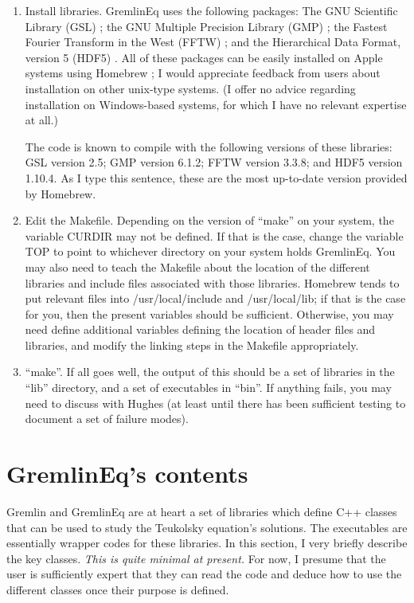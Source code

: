 \documentclass[11pt]{article}
\begin{document}
\begin{enumerate}

\item Install libraries.  GremlinEq uses the following packages: The GNU Scientific Library (GSL) {\cite{gsl}}; the GNU Multiple Precision Library (GMP) {\cite{gmp}}; the Fastest Fourier Transform in the West (FFTW) {\cite{fftw}}; and the Hierarchical Data Format, version 5 (HDF5) {\cite{hdf}}.  All of these packages can be easily installed on Apple systems using Homebrew {\cite{homebrew}}; I would appreciate feedback from users about installation on other unix-type systems.  (I offer no advice regarding installation on Windows-based systems, for which I have no relevant expertise at all.)

The code is known to compile with the following versions of these libraries: GSL version 2.5; GMP version 6.1.2; FFTW version 3.3.8; and HDF5 version 1.10.4.  As I type this sentence, these are the most up-to-date version provided by Homebrew.

\item Edit the Makefile.  Depending on the version of ``make'' on your system, the variable CURDIR may not be defined.  If that is the case, change the variable TOP to point to whichever directory on your system holds GremlinEq.  You may also need to teach the Makefile about the location of the different libraries and include files associated with those libraries.  Homebrew tends to put relevant files into /usr/local/include and /usr/local/lib; if that is the case for you, then the present variables should be sufficient.  Otherwise, you may need define additional variables defining the location of header files and libraries, and modify the linking steps in the Makefile appropriately.

\item ``make''.  If all goes well, the output of this should be a set of libraries in the ``lib'' directory, and a set of executables in ``bin''.  If anything fails, you may need to discuss with Hughes (at least until there has been sufficient testing to document a set of failure modes).

\end{enumerate}

\section{GremlinEq's contents}

Gremlin and GremlinEq are at heart a set of libraries which define C++ classes that can be used to study the Teukolsky equation's solutions.  The executables are essentially wrapper codes for these libraries.  In this section, I very briefly describe the key classes.  {\it This is quite minimal at present.}  For now, I presume that the user is sufficiently expert that they can read the code and deduce how to use the different classes once their purpose is defined.
\end{document}
